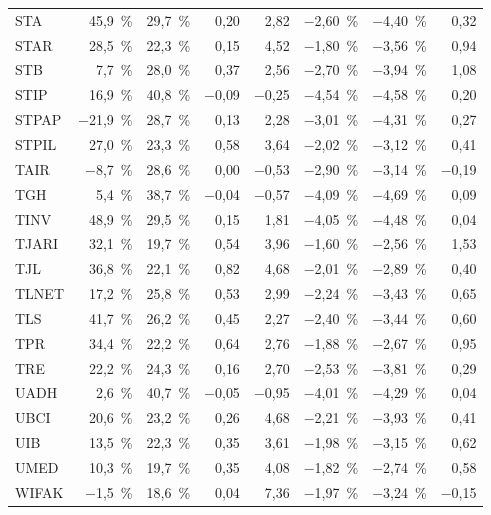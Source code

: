 \documentclass[11pt,a4paper]{article}
\begin{document}
{\begin{longtable}{lrrrrrrr}
STA & 45{,}9~\% & 29{,}7~\% & 0{,}20 & 2{,}82 & $-$2{,}60~\% & $-$4{,}40~\% & 0{,}32 \\
STAR & 28{,}5~\% & 22{,}3~\% & 0{,}15 & 4{,}52 & $-$1{,}80~\% & $-$3{,}56~\% & 0{,}94 \\
STB & 7{,}7~\% & 28{,}0~\% & 0{,}37 & 2{,}56 & $-$2{,}70~\% & $-$3{,}94~\% & 1{,}08 \\
STIP & 16{,}9~\% & 40{,}8~\% & $-$0{,}09 & $-$0{,}25 & $-$4{,}54~\% & $-$4{,}58~\% & 0{,}20 \\
STPAP & $-$21{,}9~\% & 28{,}7~\% & 0{,}13 & 2{,}28 & $-$3{,}01~\% & $-$4{,}31~\% & 0{,}27 \\
STPIL & 27{,}0~\% & 23{,}3~\% & 0{,}58 & 3{,}64 & $-$2{,}02~\% & $-$3{,}12~\% & 0{,}41 \\
TAIR & $-$8{,}7~\% & 28{,}6~\% & 0{,}00 & $-$0{,}53 & $-$2{,}90~\% & $-$3{,}14~\% & $-$0{,}19 \\
TGH & 5{,}4~\% & 38{,}7~\% & $-$0{,}04 & $-$0{,}57 & $-$4{,}09~\% & $-$4{,}69~\% & 0{,}09 \\
TINV & 48{,}9~\% & 29{,}5~\% & 0{,}15 & 1{,}81 & $-$4{,}05~\% & $-$4{,}48~\% & 0{,}04 \\
TJARI & 32{,}1~\% & 19{,}7~\% & 0{,}54 & 3{,}96 & $-$1{,}60~\% & $-$2{,}56~\% & 1{,}53 \\
TJL & 36{,}8~\% & 22{,}1~\% & 0{,}82 & 4{,}68 & $-$2{,}01~\% & $-$2{,}89~\% & 0{,}40 \\
TLNET & 17{,}2~\% & 25{,}8~\% & 0{,}53 & 2{,}99 & $-$2{,}24~\% & $-$3{,}43~\% & 0{,}65 \\
TLS & 41{,}7~\% & 26{,}2~\% & 0{,}45 & 2{,}27 & $-$2{,}40~\% & $-$3{,}44~\% & 0{,}60 \\
TPR & 34{,}4~\% & 22{,}2~\% & 0{,}64 & 2{,}76 & $-$1{,}88~\% & $-$2{,}67~\% & 0{,}95 \\
TRE & 22{,}2~\% & 24{,}3~\% & 0{,}16 & 2{,}70 & $-$2{,}53~\% & $-$3{,}81~\% & 0{,}29 \\
UADH & 2{,}6~\% & 40{,}7~\% & $-$0{,}05 & $-$0{,}95 & $-$4{,}01~\% & $-$4{,}29~\% & 0{,}04 \\
UBCI & 20{,}6~\% & 23{,}2~\% & 0{,}26 & 4{,}68 & $-$2{,}21~\% & $-$3{,}93~\% & 0{,}41 \\
UIB & 13{,}5~\% & 22{,}3~\% & 0{,}35 & 3{,}61 & $-$1{,}98~\% & $-$3{,}15~\% & 0{,}62 \\
UMED & 10{,}3~\% & 19{,}7~\% & 0{,}35 & 4{,}08 & $-$1{,}82~\% & $-$2{,}74~\% & 0{,}58 \\
WIFAK & $-$1{,}5~\% & 18{,}6~\% & 0{,}04 & 7{,}36 & $-$1{,}97~\% & $-$3{,}24~\% & $-$0{,}15 \\
\end{longtable}}
\end{document}
